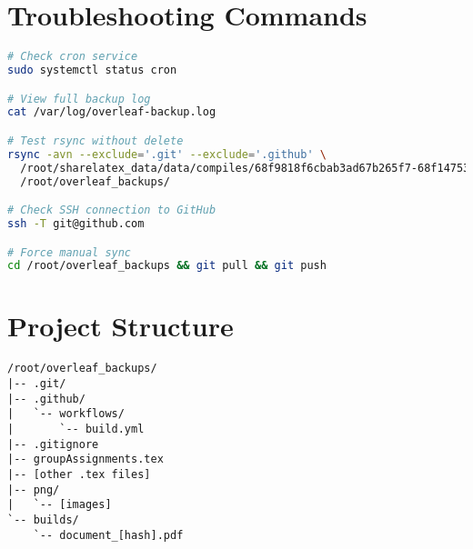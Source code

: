 \section{Troubleshooting Commands}

\begin{lstlisting}[language=bash]
# Check cron service
sudo systemctl status cron

# View full backup log
cat /var/log/overleaf-backup.log

# Test rsync without delete
rsync -avn --exclude='.git' --exclude='.github' \
  /root/sharelatex_data/data/compiles/68f9818f6cbab3ad67b265f7-68f14753eda193f7e7fa0355/ \
  /root/overleaf_backups/

# Check SSH connection to GitHub
ssh -T git@github.com

# Force manual sync
cd /root/overleaf_backups && git pull && git push
\end{lstlisting}

\section{Project Structure}

\begin{verbatim}
/root/overleaf_backups/
|-- .git/
|-- .github/
|   `-- workflows/
|       `-- build.yml
|-- .gitignore
|-- groupAssignments.tex
|-- [other .tex files]
|-- png/
|   `-- [images]
`-- builds/
    `-- document_[hash].pdf
\end{verbatim}

